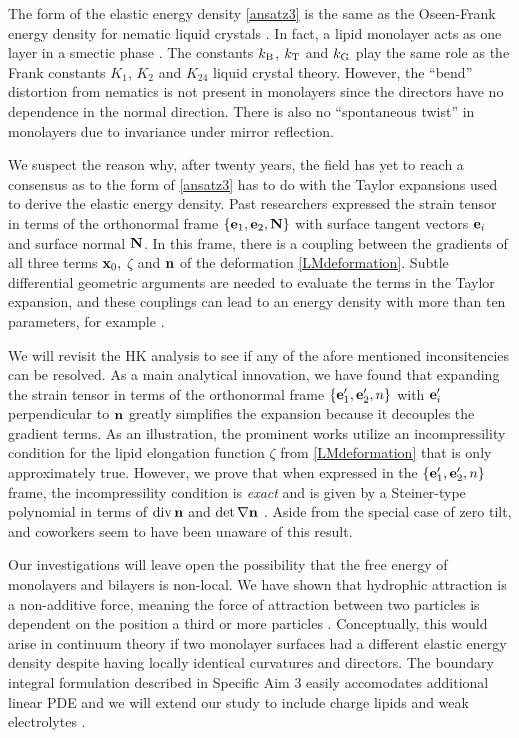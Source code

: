  
The form of the elastic energy density \eqref{ansatz3} is the same as
the Oseen-Frank energy density for nematic liquid crystals \cite{ANDRIENKO2018520,Tran7106,Helfrich73}.   In fact,  
a lipid monolayer acts as one layer in a smectic  phase \cite{REYESMATEO1995978,Rangamani20140463,PhysRevLett.113.248102}. 
The constants $k_{\mathrm{B}}$, $k_{\mathrm{T}}$  and $k_{\mathrm{G}}$ play the same role as the Frank constants $K_1$, $K_2$ and $K_{24}$
liquid crystal theory. However, the ``bend'' distortion from nematics  
is not present in monolayers since the directors have no dependence in the normal direction.
There is also no ``spontaneous twist'' in monolayers due to invariance under mirror reflection. 
  
  We suspect the reason why, after twenty years, the field has yet to reach a consensus 
  as to the form of \eqref{ansatz3} has to do with the Taylor expansions used to derive the elastic energy density. 
  Past researchers expressed the strain tensor in
  terms of the orthonormal frame $\{{\bf e}_1, {\bf e}_2, {\bf N}\}$ with surface tangent vectors ${\bf e}_i$ and surface normal ${\bf N}$.  
  In this frame, there is a coupling between the gradients of all three terms ${\bf x}_0,$ $\zeta$ and ${\bf n}$ of the deformation \eqref{LMdeformation}.
  Subtle differential geometric arguments are needed to evaluate the terms in the Taylor expansion,
  and these couplings can lead to an energy density with more than ten parameters, for example \cite{PhysRevE.102.042406}.

  We will revisit the HK analysis to see if any of the afore mentioned inconsitencies can be resolved.
  As a main analytical innovation, we have found that expanding the strain tensor in
  terms of the orthonormal frame $\{{\bf e}'_1, {\bf e}'_2, n\}$ with ${\bf e}'_i$ perpendicular to ${\bf n}$
  greatly simplifies the expansion because it decouples the gradient terms. As an illustration, the prominent works
  \cite{TerziDeserno17, PhysRevE.102.042406, Hamm2000, C9SM02079A} utilize an
  incompressility condition for the lipid elongation function $\zeta$ from \eqref{LMdeformation} that is only approximately true. 
  However, we prove that when expressed in the $\{{\bf e}'_1, {\bf e}'_2, n\}$ frame, the incompressility condition is \emph{exact}
  and is given by a Steiner-type polynomial in terms of $\operatorname{div} {\bf n}$ and $\det \nabla {\bf n}$ \cite{Fe59}.
  Aside from the special case of zero tilt, \cite{Hamm2000} and coworkers seem to have been unaware of this result.

Our investigations will leave open the possibility that the free energy of monolayers and bilayers is non-local. 
We have shown that hydrophic attraction is a non-additive force, meaning the force of attraction between two
particles is dependent on the position a third or more particles \cite{SilveraBatista1242477}.
Conceptually, this would arise in continuum theory if two monolayer surfaces
had a different elastic energy density despite having locally identical curvatures and directors.
The boundary integral formulation described in Specific Aim 3 easily accomodates additional linear PDE and
we will extend our study to include charge lipids and weak electrolytes \cite{C9SM00772E}.



